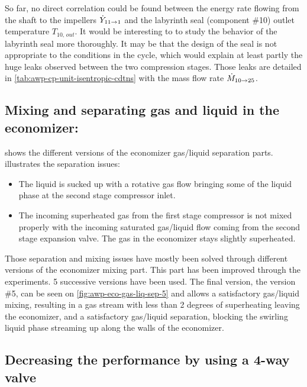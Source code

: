 So far, no direct correlation could be found between the energy rate
flowing from the shaft to the impellers $\dot{Y}_{11 \rightarrow 1}$ and the
labyrinth seal (component \#10) outlet temperature $T_{10,\,out}$. It
would be interesting to to study the behavior of the labyrinth seal
more thoroughly. It may be that the design of the seal is not
appropriate to the conditions in the cycle, which would explain at
least partly the huge leaks observed between the two compression
stages. Those leaks are detailed in
\cref{tab:awp-cp-unit-isentropic-cdtns} with the mass flow rate
$\dot{M}_{10 \rightarrow 25}$.

\subsection{Mixing and separating gas and liquid in the
  economizer:}
\label{sec:awp-issue-eco-separation}

 shows the different versions of
the economizer gas/liquid separation
parts.  illustrates the separation
issues:

\begin{itemize}
\item The liquid is sucked up with a rotative gas flow bringing some
  of the liquid phase at the second stage compressor inlet.
\item The incoming superheated gas from the first stage compressor is
  not mixed properly with the incoming saturated gas/liquid flow
  coming from the second stage expansion valve. The gas in the
  economizer stays slightly superheated.
\end{itemize}

Those separation and mixing issues have mostly been solved through
different versions of the economizer mixing part. This part has been
improved through the experiments. 5 successive versions have been
used. The final version, the version \#5, can be seen on
\cref{fig:awp-eco-gas-liq-sep-5} and allows a satisfactory gas/liquid
mixing, resulting in a gas stream with less than 2 degrees of
superheating leaving the economizer, and a satisfactory gas/liquid
separation, blocking the swirling liquid phase streaming up along the
walls of the economizer.

\subsection{Decreasing the performance by using a
  4-way valve}
\label{sec:awp-issue-4way}

